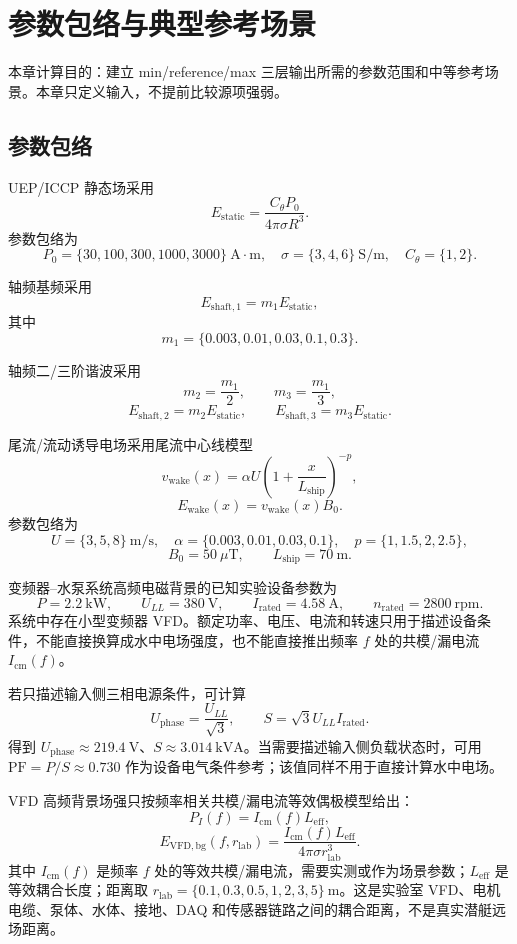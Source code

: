 \section{参数包络与典型参考场景}

本章计算目的：建立 min/reference/max 三层输出所需的参数范围和中等参考场景。本章只定义输入，不提前比较源项强弱。

\subsection{参数包络}

UEP/ICCP 静态场采用
\[
E_{\mathrm{static}}=\frac{C_\theta P_0}{4\pi\sigma R^3}.
\]
参数包络为
\[
P_0=\{30,100,300,1000,3000\}\ \mathrm{A\cdot m},\quad
\sigma=\{3,4,6\}\ \mathrm{S/m},\quad
C_\theta=\{1,2\}.
\]

轴频基频采用
\[
E_{\mathrm{shaft},1}=m_1E_{\mathrm{static}},
\]
其中
\[
m_1=\{0.003,0.01,0.03,0.1,0.3\}.
\]

轴频二/三阶谐波采用
\[
m_2=\frac{m_1}{2},\qquad m_3=\frac{m_1}{3},
\]
\[
E_{\mathrm{shaft},2}=m_2E_{\mathrm{static}},\qquad
E_{\mathrm{shaft},3}=m_3E_{\mathrm{static}}.
\]

尾流/流动诱导电场采用尾流中心线模型
\[
v_{\mathrm{wake}}(x)=\alpha U\left(1+\frac{x}{L_{\mathrm{ship}}}\right)^{-p},
\]
\[
E_{\mathrm{wake}}(x)=v_{\mathrm{wake}}(x)B_0.
\]
参数包络为
\[
U=\{3,5,8\}\ \mathrm{m/s},\quad
\alpha=\{0.003,0.01,0.03,0.1\},\quad
p=\{1,1.5,2,2.5\},
\]
\[
B_0=50\ \mu\mathrm{T},\qquad L_{\mathrm{ship}}=70\ \mathrm{m}.
\]

变频器--水泵系统高频电磁背景的已知实验设备参数为
\[
P=2.2\ \mathrm{kW},\qquad U_{LL}=380\ \mathrm{V},\qquad
I_{\mathrm{rated}}=4.58\ \mathrm{A},\qquad n_{\mathrm{rated}}=2800\ \mathrm{rpm}.
\]
系统中存在小型变频器 VFD。额定功率、电压、电流和转速只用于描述设备条件，不能直接换算成水中电场强度，也不能直接推出频率 $f$ 处的共模/漏电流 $I_{\mathrm{cm}}(f)$。

若只描述输入侧三相电源条件，可计算
\[
U_{\mathrm{phase}}=\frac{U_{LL}}{\sqrt{3}},\qquad
S=\sqrt{3}U_{LL}I_{\mathrm{rated}}.
\]
得到 $U_{\mathrm{phase}}\approx219.4\ \mathrm{V}$、$S\approx3.014\ \mathrm{kVA}$。当需要描述输入侧负载状态时，可用 $\mathrm{PF}=P/S\approx0.730$ 作为设备电气条件参考；该值同样不用于直接计算水中电场。

VFD 高频背景场强只按频率相关共模/漏电流等效偶极模型给出：
\[
P_I(f)=I_{\mathrm{cm}}(f)L_{\mathrm{eff}},
\]
\[
E_{\mathrm{VFD,bg}}(f,r_{\mathrm{lab}})=
\frac{I_{\mathrm{cm}}(f)L_{\mathrm{eff}}}{4\pi\sigma r_{\mathrm{lab}}^3}.
\]
其中 $I_{\mathrm{cm}}(f)$ 是频率 $f$ 处的等效共模/漏电流，需要实测或作为场景参数；$L_{\mathrm{eff}}$ 是等效耦合长度；距离取 $r_{\mathrm{lab}}=\{0.1,0.3,0.5,1,2,3,5\}\ \mathrm{m}$。这是实验室 VFD、电机电缆、泵体、水体、接地、DAQ 和传感器链路之间的耦合距离，不是真实潜艇远场距离。

